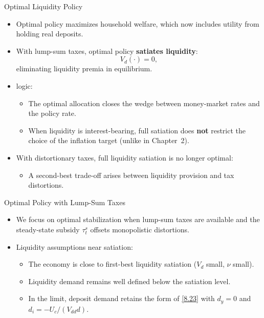 \documentclass[11pt,aspectratio=169]{beamer}
\begin{document}
\begin{frame}{Optimal Liquidity Policy}
\small
\begin{itemize}
  \item Optimal policy maximizes household welfare, which now includes utility from holding real deposits.
  \vspace{0.4em}

  \item With lump-sum taxes, optimal policy \textbf{satiates liquidity}:
  \[
    V_d(\cdot)=0,
  \]
  eliminating liquidity premia in equilibrium.
  \vspace{0.4em}

  \item \textcite{friedman1960program} logic:
  \begin{itemize}
    \item The optimal allocation closes the wedge between money-market rates and the policy rate.
    \item When liquidity is interest-bearing, full satiation does \textbf{not} restrict the choice of the inflation target (unlike in Chapter~2).
  \end{itemize}
  \vspace{0.4em}

  \item With distortionary taxes, full liquidity satiation is no longer optimal:
  \begin{itemize}
    \item A second-best trade-off arises between liquidity provision and tax distortions.
  \end{itemize}
\end{itemize}
\end{frame}

\begin{frame}{Optimal Policy with Lump-Sum Taxes}

\begin{itemize}
    \item We focus on optimal stabilization when lump-sum taxes are available and the steady-state subsidy $\tau_t^s$ offsets monopolistic distortions.
\vspace{1em}
  \item Liquidity assumptions near satiation:
  \begin{itemize}
    \item The economy is close to first-best liquidity satiation ($V_d$ small, $\nu$ small).
    \vspace{0.5em}
    \item Liquidity demand remains well defined below the satiation level.
    \vspace{0.5em}
    \item In the limit, deposit demand retains the form of \eqref{8.23} with $d_y = 0$ and $d_i = -U_c/(V_{dd}d)$.
  \end{itemize}
\end{itemize}

\end{frame}
\end{document}
